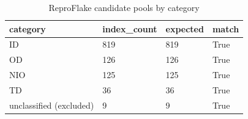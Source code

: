 \begin{table}[t]
\centering\small
\caption{ReproFlake candidate pools by category}
\label{tab:category_counts}
\begin{tabular}{llll}
\toprule
\textbf{category} & \textbf{index\_count} & \textbf{expected} & \textbf{match} \\
\midrule
ID & 819 & 819 & True \\
OD & 126 & 126 & True \\
NIO & 125 & 125 & True \\
TD & 36 & 36 & True \\
unclassified (excluded) & 9 & 9 & True \\
\bottomrule
\end{tabular}
\end{table}
